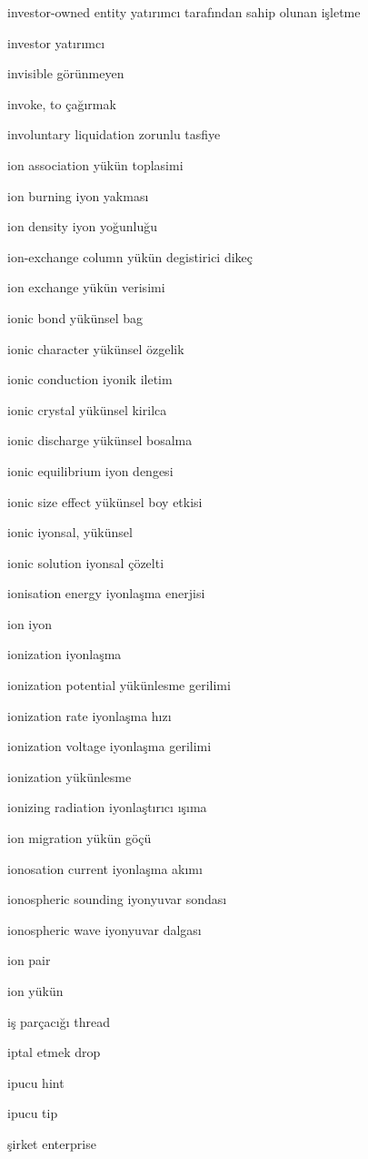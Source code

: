 \documentclass[12pt,fleqn]{article}\usepackage{../../common}
\begin{document}
investor-owned entity yatırımcı tarafından sahip olunan işletme

investor yatırımcı

invisible görünmeyen

invoke, to çağırmak

involuntary liquidation zorunlu tasfiye

ion association yükün toplasimi

ion burning iyon yakması

ion density iyon yoğunluğu

ion-exchange column yükün degistirici dikeç

ion exchange yükün verisimi

ionic bond yükünsel bag

ionic character yükünsel özgelik

ionic conduction iyonik iletim

ionic crystal yükünsel kirilca

ionic discharge yükünsel bosalma

ionic equilibrium iyon dengesi

ionic size effect yükünsel boy etkisi

ionic iyonsal, yükünsel

ionic solution iyonsal çözelti

ionisation energy iyonlaşma enerjisi

ion iyon

ionization iyonlaşma

ionization potential yükünlesme gerilimi

ionization rate iyonlaşma hızı

ionization voltage iyonlaşma gerilimi

ionization yükünlesme

ionizing radiation iyonlaştırıcı ışıma

ion migration yükün göçü

ionosation current iyonlaşma akımı

ionospheric sounding iyonyuvar sondası

ionospheric wave iyonyuvar dalgası

ion pair

ion yükün

iş parçacığı thread

iptal etmek drop

ipucu hint

ipucu tip

şirket enterprise
\end{document}

